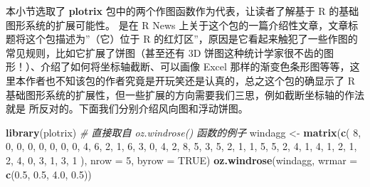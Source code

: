 \documentclass[
  b5paper,
  UTF8,twoside]{book}
\newenvironment{Shaded}{\begin{snugshade}}{\end{snugshade}}
\newcommand{\AttributeTok}[1]{\textcolor[rgb]{0.13,0.29,0.53}{#1}}
\newcommand{\CommentTok}[1]{\textcolor[rgb]{0.56,0.35,0.01}{\textit{#1}}}
\newcommand{\ConstantTok}[1]{\textcolor[rgb]{0.56,0.35,0.01}{#1}}
\newcommand{\DecValTok}[1]{\textcolor[rgb]{0.00,0.00,0.81}{#1}}
\newcommand{\FloatTok}[1]{\textcolor[rgb]{0.00,0.00,0.81}{#1}}
\newcommand{\FunctionTok}[1]{\textcolor[rgb]{0.13,0.29,0.53}{\textbf{#1}}}
\newcommand{\NormalTok}[1]{#1}
\newcommand{\OtherTok}[1]{\textcolor[rgb]{0.56,0.35,0.01}{#1}}
\begin{document}
本小节选取了 \textbf{plotrix} 包中的两个作图函数作为代表，让读者了解基于 R 的基础图形系统的扩展可能性。\citet{Lemon06} 是在 R
News 上关于这个包的一篇介绍性文章，文章标题将这个包描述为''（它）位于 R 的红灯区''，原因是它看起来触犯了一些作图的常见规则，比如它扩展了饼图（甚至还有 3D 饼图这种统计学家很不齿的图形！）、介绍了如何将坐标轴截断、可以画像 Excel 那样的渐变色条形图等等，这里本作者也不知该包的作者究竟是开玩笑还是认真的，总之这个包的确显示了 R 基础图形系统的扩展性，但一些扩展的方向需要我们三思，例如截断坐标轴的作法就是 \citet{Cleveland85} 所反对的。下面我们分别介绍风向图和浮动饼图。





\begin{Shaded}
\begin{Highlighting}[]
\FunctionTok{library}\NormalTok{(plotrix) }\CommentTok{\# 直接取自 oz.windrose() 函数的例子}
\NormalTok{windagg }\OtherTok{\textless{}{-}} \FunctionTok{matrix}\NormalTok{(}\FunctionTok{c}\NormalTok{(}
  \DecValTok{8}\NormalTok{, }\DecValTok{0}\NormalTok{, }\DecValTok{0}\NormalTok{, }\DecValTok{0}\NormalTok{, }\DecValTok{0}\NormalTok{, }\DecValTok{0}\NormalTok{, }\DecValTok{0}\NormalTok{, }
  \DecValTok{0}\NormalTok{, }\DecValTok{4}\NormalTok{, }\DecValTok{6}\NormalTok{, }\DecValTok{2}\NormalTok{, }\DecValTok{1}\NormalTok{, }\DecValTok{6}\NormalTok{, }\DecValTok{3}\NormalTok{, }
  \DecValTok{0}\NormalTok{, }\DecValTok{4}\NormalTok{, }\DecValTok{2}\NormalTok{, }\DecValTok{8}\NormalTok{, }\DecValTok{5}\NormalTok{, }\DecValTok{3}\NormalTok{, }\DecValTok{5}\NormalTok{, }
  \DecValTok{2}\NormalTok{, }\DecValTok{1}\NormalTok{, }\DecValTok{1}\NormalTok{, }\DecValTok{5}\NormalTok{, }\DecValTok{5}\NormalTok{, }\DecValTok{2}\NormalTok{, }\DecValTok{4}\NormalTok{, }
  \DecValTok{1}\NormalTok{, }\DecValTok{4}\NormalTok{, }\DecValTok{1}\NormalTok{, }\DecValTok{2}\NormalTok{, }\DecValTok{1}\NormalTok{, }\DecValTok{2}\NormalTok{, }\DecValTok{4}\NormalTok{, }
  \DecValTok{0}\NormalTok{, }\DecValTok{3}\NormalTok{, }\DecValTok{1}\NormalTok{, }\DecValTok{3}\NormalTok{, }\DecValTok{1}
\NormalTok{), }\AttributeTok{nrow =} \DecValTok{5}\NormalTok{, }\AttributeTok{byrow =} \ConstantTok{TRUE}\NormalTok{)}
\FunctionTok{oz.windrose}\NormalTok{(windagg, }\AttributeTok{wrmar =} \FunctionTok{c}\NormalTok{(}\FloatTok{0.5}\NormalTok{, }\FloatTok{0.5}\NormalTok{, }\FloatTok{4.0}\NormalTok{, }\FloatTok{0.5}\NormalTok{))}
\end{Highlighting}
\end{Shaded}
\end{document}
